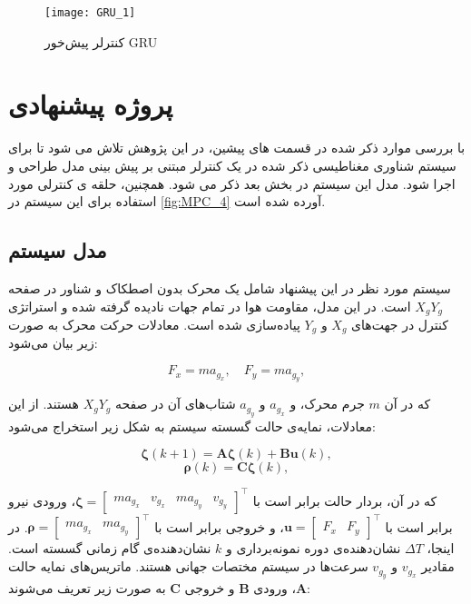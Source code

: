\begin{figure}[H]
	\centering
	\texttt{[image: GRU\_1]}
	\caption{کنترلر پیش‌خور GRU \cite{RN61}}
	\label{fig:GRU}
\end{figure}

\section{پروژه پیشنهادی}
با بررسی موارد ذکر شده در قسمت های پیشین، در این پژوهش تلاش می شود تا برای سیستم شناوری مغناطیسی ذکر شده در \cite{RN30} یک کنترلر مبتنی بر پیش بینی مدل طراحی و اجرا شود. مدل این سیستم در بخش بعد ذکر می شود. همچنین، حلقه ی کنترلی مورد استفاده برای این سیستم در 
\ref{fig:MPC_4}
آورده شده است.

\subsection{مدل سیستم}
سیستم مورد نظر در این پیشنهاد شامل یک محرک بدون اصطکاک و شناور در صفحه \( X_gY_g \) است. در این مدل، مقاومت هوا در تمام جهات نادیده گرفته شده و استراتژی کنترل در جهت‌های \( X_g \) و \( Y_g \) پیاده‌سازی شده است. معادلات حرکت محرک به صورت زیر بیان می‌شود:

\begin{equation}
	F_x = m a_{g_x},
	\quad F_y = m a_{g_y},
\end{equation}

که در آن \( m \) جرم محرک، و \( a_{g_x} \) و \( a_{g_y} \) شتاب‌های آن در صفحه \( X_gY_g \) هستند. از این معادلات، نمایه‌ی حالت گسسته سیستم به شکل زیر استخراج می‌شود:

\begin{equation}
	\bm{\zeta}(k + 1) = \bm{A} \bm{\zeta}(k) + \bm{B} \bm{u}(k),
\end{equation}
\begin{equation}
	\bm{\rho}(k) = \bm{C} \bm{\zeta}(k),
\end{equation}

که در آن، بردار حالت برابر است با \( \bm{\zeta} = \begin{bmatrix} m a_{g_x} & v_{g_x} & m a_{g_y} & v_{g_y} \end{bmatrix}^\top \)، ورودی نیرو برابر است با \( \bm{u} = \begin{bmatrix} F_x & F_y \end{bmatrix}^\top \)، و خروجی برابر است با \( \bm{\rho} = \begin{bmatrix} m a_{g_x} & m a_{g_y} \end{bmatrix}^\top \). در اینجا، \( \Delta T \) نشان‌دهنده‌ی دوره نمونه‌برداری و \( k \) نشان‌دهنده‌ی گام زمانی گسسته است. مقادیر \( v_{g_x} \) و \( v_{g_y} \) سرعت‌ها در سیستم مختصات جهانی هستند. ماتریس‌های نمایه حالت \( \bm{A} \)، ورودی \( \bm{B} \) و خروجی \( \bm{C} \) به صورت زیر تعریف می‌شوند:

